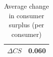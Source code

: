 \begin{table}[H]
\centering
\caption{Average change in consumer surplus (per consumer)}
\begin{tabular}{lc}
\hline $\Delta CS$ & 0.060 \\ \hline
\end{tabular}\end{table}
